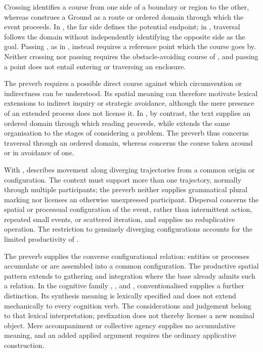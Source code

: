 Crossing  identifies a course from one side of a boundary or
region to the other, whereas  construes a Ground as a route or
ordered domain through which the event proceeds. In 
, the far side defines the potential endpoint; in
 , traversal follows the domain without
independently identifying the opposite side as the goal. Passing ,
as in , instead requires a reference point which the course
goes by. Neither crossing nor passing requires the obstacle-avoiding course
of , and passing a point does not entail entering or traversing
an enclosure.

The preverb  requires a possible direct course against which
circumvention or indirectness can be understood. Its spatial meaning can therefore motivate
lexical extensions to indirect inquiry or strategic avoidance, although the
mere presence of an extended process does not license it. In
, by contrast, the text supplies an ordered domain through
which reading proceeds, while  extends the same organisation
to the stages of considering a problem. The preverb  thus
concerns traversal through an ordered domain, whereas  concerns the course taken
around or in avoidance of one.

With  ,  describes
movement along diverging trajectories from a common origin or configuration.
The context must support more than one trajectory, normally through multiple
participants; the preverb neither supplies grammatical plural marking nor
licenses an otherwise unexpressed participant. Dispersal concerns the spatial
or processual configuration of the event, rather than intermittent action,
repeated small events, or scattered iteration, and supplies no reduplicative
operation. The restriction to genuinely diverging configurations accounts for the limited
productivity of .

The preverb  supplies the converse configurational relation: entities
or processes accumulate or are assembled into a common configuration. The productive spatial
pattern extends to gathering and integration where the base already admits
such a relation. In the cognitive family  ,
 , and 
, conventionalised 
 supplies a
further distinction. Its synthesis meaning is lexically specified and does not
extend mechanically to every cognition verb. The considerations and judgement
belong to that lexical interpretation; prefixation does not thereby license a
new nominal object. Mere accompaniment or collective agency supplies no
accumulative meaning, and an added applied argument requires the ordinary
applicative construction.

